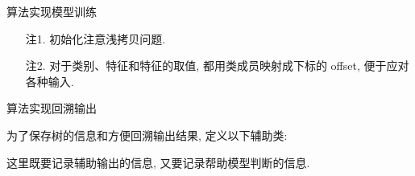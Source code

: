 \begin{frame}{算法实现}{模型训练}

\vspace{-1cm}

\begin{figure}[bth]
\end{figure}


{\linespread{1}\small
\begin{itemize}
\item[注1.] 初始化注意浅拷贝问题.
\item[注2.] 对于类别、特征和特征的取值, 都用类成员映射成下标的 offset, 便于应对各种输入.
\end{itemize}}

\end{frame}

\begin{frame}{算法实现}{回溯输出}

\vspace{-0.2cm}

为了保存树的信息和方便回溯输出结果, 定义以下辅助类:

\begin{figure}[bth]
\end{figure}

\vspace{-0.1cm}

\noindent 这里既要记录辅助输出的信息, 又要记录帮助模型判断的信息.
\end{frame}

